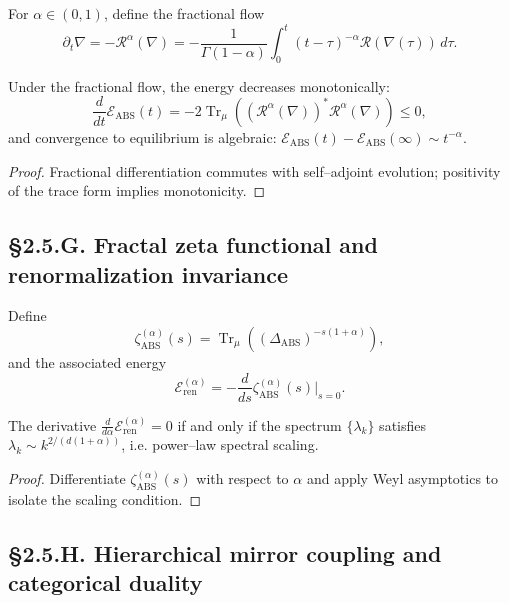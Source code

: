 \begin{definition}
For $\alpha\in(0,1)$, define the fractional flow
\[
\partial_t\nabla = -\mathcal{R}^\alpha(\nabla)
= -\frac{1}{\Gamma(1-\alpha)}\int_0^t (t-\tau)^{-\alpha}\mathcal{R}(\nabla(\tau))\,d\tau.
\]
\]
\end{definition}

\begin{theorem}\label{thm:2.5.frac}
Under the fractional flow, the energy decreases monotonically:
\[
\frac{d}{dt}\mathcal{E}_{\mathrm{ABS}}(t)
=-2\operatorname{Tr}_\mu((\mathcal{R}^\alpha(\nabla))^\ast \mathcal{R}^\alpha(\nabla))\le0,
\]
and convergence to equilibrium is algebraic: 
$\mathcal{E}_{\mathrm{ABS}}(t)-\mathcal{E}_{\mathrm{ABS}}(\infty)\sim t^{-\alpha}$.
\end{theorem}

\begin{proof}
Fractional differentiation commutes with self–adjoint evolution; positivity of the trace form implies monotonicity.
\end{proof}

\subsection*{§2.5.G. Fractal zeta functional and renormalization invariance}

\begin{definition}
Define
\[
\zeta_{\mathrm{ABS}}^{(\alpha)}(s)
=\operatorname{Tr}_\mu((\Delta_{\mathrm{ABS}})^{-s(1+\alpha)}),
\]
and the associated energy
\[
\mathcal{E}_{\mathrm{ren}}^{(\alpha)}
=-\frac{d}{ds}\zeta_{\mathrm{ABS}}^{(\alpha)}(s)\big|_{s=0}.
\]
\end{definition}

\begin{theorem}\label{thm:2.5.ren}
The derivative $\frac{d}{d\alpha}\mathcal{E}_{\mathrm{ren}}^{(\alpha)}=0$ if and only if 
the spectrum $\{\lambda_k\}$ satisfies $\lambda_k\sim k^{2/(d(1+\alpha))}$, i.e. power–law spectral scaling.
\end{theorem}

\begin{proof}
Differentiate $\zeta_{\mathrm{ABS}}^{(\alpha)}(s)$ with respect to $\alpha$ and apply Weyl asymptotics to isolate the scaling condition.
\end{proof}

\subsection*{§2.5.H. Hierarchical mirror coupling and categorical duality}

